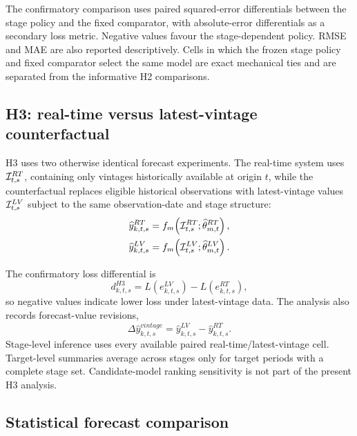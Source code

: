 The confirmatory comparison uses paired squared-error differentials between the stage policy and the fixed comparator, with absolute-error differentials as a secondary loss metric. Negative values favour the stage-dependent policy. RMSE and MAE are also reported descriptively. Cells in which the frozen stage policy and fixed comparator select the same model are exact mechanical ties and are separated from the informative H2 comparisons.

\subsection{H3: real-time versus latest-vintage counterfactual}
\label{subsec:h3_design}

H3 uses two otherwise identical forecast experiments. The real-time system uses $\mathcal{I}_{t,s}^{RT}$, containing only vintages historically available at origin $t$, while the counterfactual replaces eligible historical observations with latest-vintage values $\mathcal{I}_{t,s}^{LV}$ subject to the same observation-date and stage structure:
\begin{align}
    \widehat{y}_{k,t,s}^{RT}
    &=f_m\!\left(\mathcal{I}_{t,s}^{RT};\widehat{\theta}_{m,t}^{RT}\right),
    \label{eq:h3_rt_forecast}\\
    \widehat{y}_{k,t,s}^{LV}
    &=f_m\!\left(\mathcal{I}_{t,s}^{LV};\widehat{\theta}_{m,t}^{LV}\right).
    \label{eq:h3_lv_forecast}
\end{align}

The confirmatory loss differential is
\begin{equation}
    d_{k,t,s}^{H3}
    =
    L\!\left(e_{k,t,s}^{LV}\right)
    -
    L\!\left(e_{k,t,s}^{RT}\right),
    \label{eq:h3_experiment_loss}
\end{equation}
so negative values indicate lower loss under latest-vintage data. The analysis also records forecast-value revisions,
\begin{equation}
    \Delta \widehat{y}_{k,t,s}^{vintage}
    =
    \widehat{y}_{k,t,s}^{LV}
    -
    \widehat{y}_{k,t,s}^{RT}.
    \label{eq:h3_forecast_change}
\end{equation}
Stage-level inference uses every available paired real-time/latest-vintage cell. Target-level summaries average across stages only for target periods with a complete stage set. Candidate-model ranking sensitivity is not part of the present H3 analysis.

\subsection{Statistical forecast comparison}
\label{subsec:forecast_tests}

